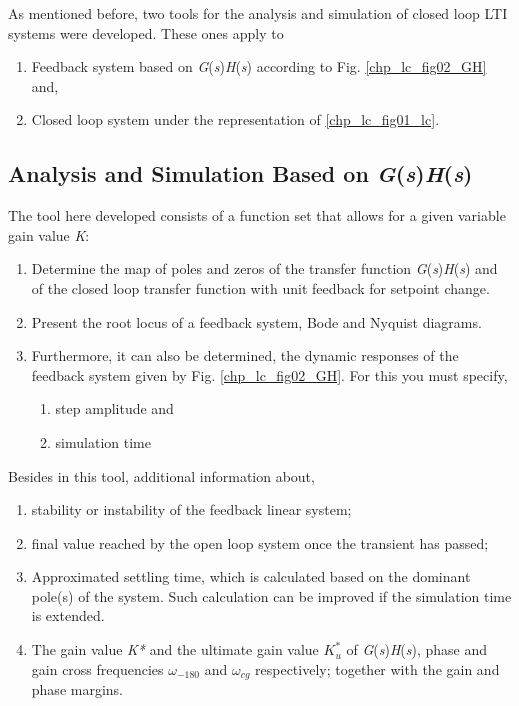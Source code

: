 As mentioned before, two tools for the analysis and simulation of closed loop LTI systems were developed. These ones apply to 
\begin{enumerate}
	\item Feedback system based on \textit{G}(\textit{s})\textit{H}(\textit{s}) according to Fig. \ref{chp_lc_fig02_GH} and,
	\item Closed loop system under the representation of \ref{chp_lc_fig01_lc}.
\end{enumerate}

\subsection{Analysis and Simulation Based on \textit{G}(\textit{s})\textit{H}(\textit{s})}

The tool here developed consists of a function set that allows for a given variable gain value \textit{K}:
\begin{enumerate}
	\item Determine the map of poles and zeros of the transfer function \textit{G}(\textit{s})\textit{H}(\textit{s}) and of the closed loop transfer function with unit feedback for setpoint change.
	\item Present the root locus  of a feedback system, Bode and Nyquist diagrams.
	\item Furthermore, it can also be determined, the dynamic responses of the feedback system given by Fig. \ref{chp_lc_fig02_GH}. For this you must specify,
	\begin{enumerate}
		\item step amplitude and
		\item simulation time
	\end{enumerate}
\end{enumerate}

\vspace{0.4cm}
Besides in this tool, additional information about,
\begin{enumerate}
	\item stability or instability of the feedback linear system;
	\item final value reached by the open loop system once the transient has passed;
	\item Approximated settling time, which is calculated based on the dominant pole(s) of the system. Such calculation can be improved if the simulation time is extended.
	\item The gain value \textit{K*} and the ultimate gain value $K^*_u$ of \textit{G}(\textit{s})\textit{H}(\textit{s}), phase and gain cross frequencies $\omega_{-180}$ and $\omega_{cg}$ respectively; together with the gain and phase margins.
\end{enumerate}

